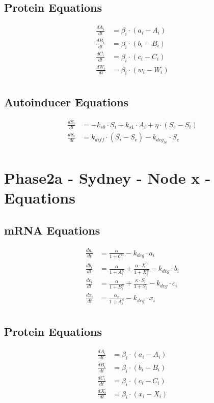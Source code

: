 \documentclass[fleqn]{article} %
\begin{document}
\subsection*{Protein Equations}
\begin{align*}
\frac{dA_i}{dt} &= \beta_i \cdot (a_i - A_i) \\
\frac{dB_i}{dt} &= \beta_i \cdot (b_i - B_i) \\
\frac{dC_i}{dt} &= \beta_i \cdot (c_i - C_i) \\
\frac{dW_i}{dt} &= \beta_i \cdot (w_i - W_i) \\
\end{align*}

\subsection*{Autoinducer Equations}
\begin{align*}
\frac{dS_i}{dt} &= -k_{s0} \cdot S_i + k_{s1} \cdot A_i + \eta \cdot (S_e - S_i) \\
\frac{dS_e}{dt} &= k_{diff} \cdot (\overline{S_i} - S_e) - k_{deg_{Se}} \cdot S_e \\
\end{align*}

\pagebreak

\section*{Phase2a - Sydney - Node x - Equations}
\subsection*{mRNA Equations}
\begin{align*}
\frac{da_i}{dt} &= \frac{\alpha}{1 + C_i^n} - k_{deg} \cdot a_i \\
\frac{db_i}{dt} &= \frac{\alpha}{1 + A_i^n} + \frac{\alpha \cdot X_i^n}{1 + X_i^n} - k_{deg} \cdot b_i \\
\frac{dc_i}{dt} &= \frac{\alpha}{1 + B_i^n} + \frac{\kappa \cdot S_i}{1 + S_i} - k_{deg} \cdot c_i \\
\frac{dx_i}{dt} &= \frac{\alpha_x}{1 + A_i^n} - k_{deg} \cdot x_i \\
\end{align*}

\subsection*{Protein Equations}
\begin{align*}
\frac{dA_i}{dt} &= \beta_i \cdot (a_i - A_i) \\
\frac{dB_i}{dt} &= \beta_i \cdot (b_i - B_i) \\
\frac{dC_i}{dt} &= \beta_i \cdot (c_i - C_i) \\
\frac{dX_i}{dt} &= \beta_i \cdot (x_i - X_i) \\
\end{align*}
\end{document}
